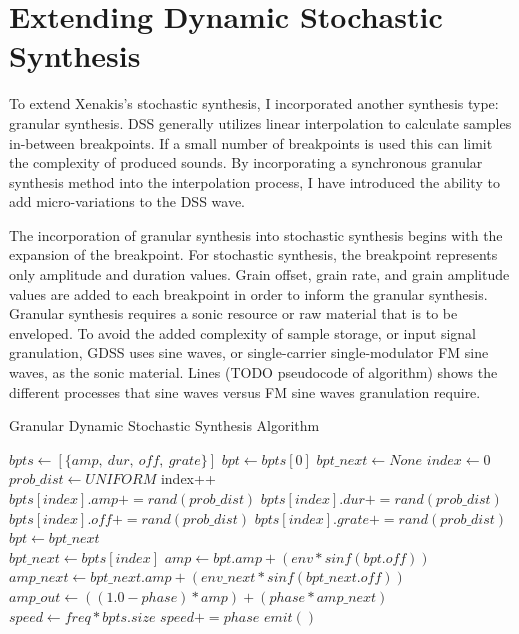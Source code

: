 \documentclass[10pt]{article}
\begin{document}
\section{Extending Dynamic Stochastic Synthesis}
To extend Xenakis's stochastic synthesis, I incorporated another synthesis type: granular synthesis. DSS generally utilizes linear interpolation to calculate samples in-between breakpoints. If a small number of breakpoints is used this can limit the complexity of produced sounds. By incorporating a synchronous granular synthesis method into the interpolation process, I have introduced the ability to add micro-variations to the DSS wave. 

The incorporation of granular synthesis into stochastic synthesis begins with the expansion of the breakpoint. For stochastic synthesis, the breakpoint represents only amplitude and duration values. Grain offset, grain rate, and grain amplitude values are added to each breakpoint in order to inform the granular synthesis. Granular synthesis requires a sonic resource or raw material that is to be enveloped. To avoid the added complexity of sample storage, or input signal granulation, GDSS uses sine waves, or single-carrier single-modulator FM sine waves, as the sonic material. Lines (TODO pseudocode of algorithm) shows the different processes that sine waves versus FM sine waves granulation require.

\begin{algorithm}
\caption{Granular Dynamic Stochastic Synthesis Algorithm}
    \begin{algorithmic}
        \STATE $bpts\gets [\{amp,\ dur,\ off,\ grate\}]$
        \STATE $bpt\gets bpts[0]$
        \STATE $bpt\_next\gets None$
        \STATE $index\gets 0$
        \STATE $prob\_dist\gets UNIFORM$
        \LOOP
                \STATE index++\\
                \STATE $bpts[index].amp += rand(prob\_dist)$
                \STATE $bpts[index].dur += rand(prob\_dist)$
                \STATE $bpts[index].off += rand(prob\_dist)$
                \STATE $bpts[index].grate += rand(prob\_dist)$
                \STATE $bpt\gets bpt\_next$\\
                \STATE $bpt\_next\gets bpts[index]$
            \ENDIF
            \STATE $amp\gets bpt.amp + (env * sinf(bpt.off))$
            \STATE $amp\_next\gets bpt\_next.amp + (env\_next * sinf(bpt\_next.off))$
            \STATE $amp\_out\gets ((1.0 - phase) * amp) + (phase * amp\_next)$
            \STATE $speed\gets freq * bpts.size$
            \STATE $speed += phase$
            \STATE $emit()$
        \ENDLOOP
    \end{algorithmic}
\end{algorithm}
\end{document}

